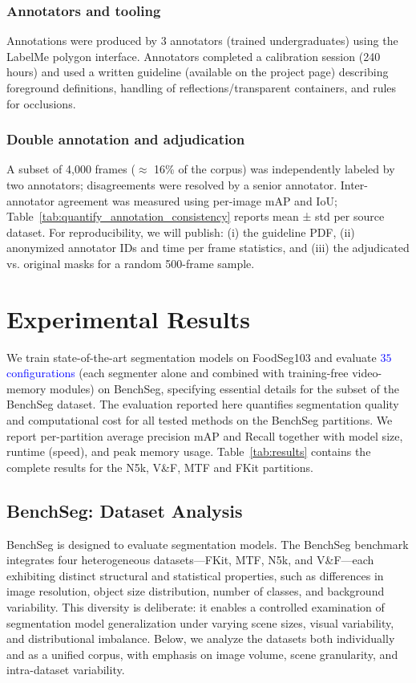 \documentclass[preprint,12pt]{elsarticle}
\newcommand{\change}[1]{\textcolor{blue}{#1}}
\begin{document}
\subsubsection*{Annotators and tooling}
Annotations were produced by 3 annotators (trained undergraduates) using the LabelMe \cite{russell2008labelme} polygon interface. Annotators completed a calibration session (240 hours) and used a written guideline (available on the project page) describing foreground definitions, handling of reflections/transparent containers, and rules for occlusions.

\subsubsection*{Double annotation and adjudication}
A subset of 4,000 frames ($\approx$ 16\% of the corpus) was independently labeled by two annotators; disagreements were resolved by a senior annotator. Inter-annotator agreement was measured using per-image mAP and IoU; Table~\ref{tab:quantify_annotation_consistency} reports mean ± std per source dataset. For reproducibility, we will publish: (i) the guideline PDF, (ii) anonymized annotator IDs and time per frame statistics, and (iii) the adjudicated vs. original masks for a random 500-frame sample.

\section{Experimental Results}
\label{sec:experimental_results}
We train state-of-the-art segmentation models on FoodSeg103 and evaluate \change{$35$ configurations} (each segmenter alone and combined with training-free video-memory modules) on BenchSeg, specifying essential details for the subset of the BenchSeg dataset. The evaluation reported here quantifies segmentation quality and computational cost for all tested methods on the BenchSeg partitions. We report per-partition average precision $\mathrm{mAP}$ and Recall together with model size, runtime (speed), and peak memory usage. Table~\ref{tab:results} contains the complete results for the N5k, V\&F, MTF and FKit partitions.


\subsection{BenchSeg: Dataset Analysis}
BenchSeg is designed to evaluate segmentation models. The BenchSeg benchmark integrates four heterogeneous datasets—FKit, MTF, N5k, and V\&F—each exhibiting distinct structural and statistical properties, such as differences in image resolution, object size distribution, number of classes, and background variability. This diversity is deliberate: it enables a controlled examination of segmentation model generalization under varying scene sizes, visual variability, and distributional imbalance. Below, we analyze the datasets both individually and as a unified corpus, with emphasis on image volume, scene granularity, and intra-dataset variability.
\end{document}
